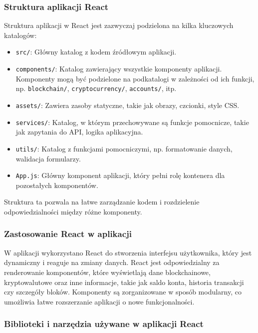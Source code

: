 \subsubsection{Struktura aplikacji React}

Struktura aplikacji w React jest zazwyczaj podzielona na kilka kluczowych katalogów:

\begin{itemize}
    \item \texttt{src/}: Główny katalog z kodem źródłowym aplikacji.
    \item \texttt{components/}: Katalog zawierający wszystkie komponenty aplikacji. Komponenty mogą być podzielone na podkatalogi w zależności od ich funkcji, np. \texttt{blockchain/}, \texttt{cryptocurrency/}, \texttt{accounts/}, itp.
    \item \texttt{assets/}: Zawiera zasoby statyczne, takie jak obrazy, czcionki, style CSS.
    \item \texttt{services/}: Katalog, w którym przechowywane są funkcje pomocnicze, takie jak zapytania do API, logika aplikacyjna.
    \item \texttt{utils/}: Katalog z funkcjami pomocniczymi, np. formatowanie danych, walidacja formularzy.
    \item \texttt{App.js}: Główny komponent aplikacji, który pełni rolę kontenera dla pozostałych komponentów.
\end{itemize}

Struktura ta pozwala na łatwe zarządzanie kodem i rozdzielenie odpowiedzialności między różne komponenty.

\subsubsection{Zastosowanie React w aplikacji}

W aplikacji wykorzystano React do stworzenia interfejsu użytkownika, który jest dynamiczny i reaguje na zmiany danych. React jest odpowiedzialny za renderowanie komponentów, które wyświetlają dane blockchainowe, kryptowalutowe oraz inne informacje, takie jak saldo konta, historia transakcji czy szczegóły bloków. Komponenty są zorganizowane w sposób modularny, co umożliwia łatwe rozszerzanie aplikacji o nowe funkcjonalności.

\subsubsection{Biblioteki i narzędzia używane w aplikacji React}


